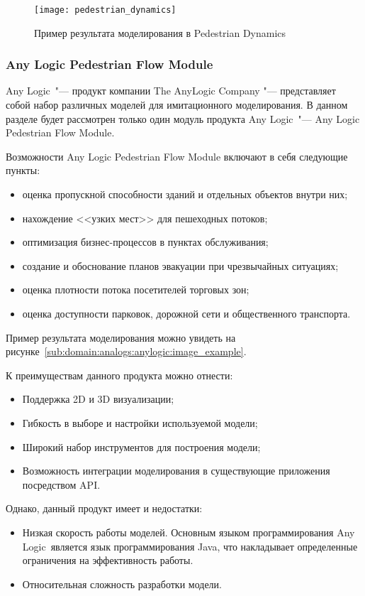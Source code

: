 \begin{figure}[ht!]
  \texttt{[image: pedestrian\_dynamics]}
  \caption{Пример результата моделирования в Pedestrian Dynamics}
  \label{sub:domain:analogs:pd:image_example}
\end{figure}

\subsubsection{Any Logic Pedestrian Flow Module}
\label{sub:domain:analogs:anylogic}

Any Logic\textregistered\ "--- продукт компании The AnyLogic Company "--- представляет собой набор различных моделей для имитационного моделирования.
В данном разделе будет рассмотрен только один модуль продукта Any Logic\textregistered\ "--- Any Logic Pedestrian Flow Module.

Возможности Any Logic Pedestrian Flow Module включают в себя следующие пункты:
\begin{itemize}
  \item оценка пропускной способности зданий и отдельных объектов внутри них;
  \item нахождение <<узких мест>> для пешеходных потоков;
  \item оптимизация бизнес-процессов в пунктах обслуживания;
  \item создание и обоснование планов эвакуации при чрезвычайных ситуациях;
  \item оценка плотности потока посетителей торговых зон;
  \item оценка доступности парковок, дорожной сети и общественного транспорта.
\end{itemize}

Пример результата моделирования можно увидеть на рисунке~\ref{sub:domain:analogs:anylogic:image_example}.

К преимуществам данного продукта можно отнести:
\begin{itemize}
  \item Поддержка 2D и 3D визуализации;
  \item Гибкость в выборе и настройки используемой модели;
  \item Широкий набор инструментов для построения модели;
  \item Возможность интеграции моделирования в существующие приложения посредством API.
\end{itemize}

Однако, данный продукт имеет и недостатки:
\begin{itemize}
  \item Низкая скорость работы моделей. Основным языком программирования Any Logic\textregistered\ является язык программирования Java, что накладывает определенные ограничения на эффективность работы.
  \item Относительная сложность разработки модели.
\end{itemize}

